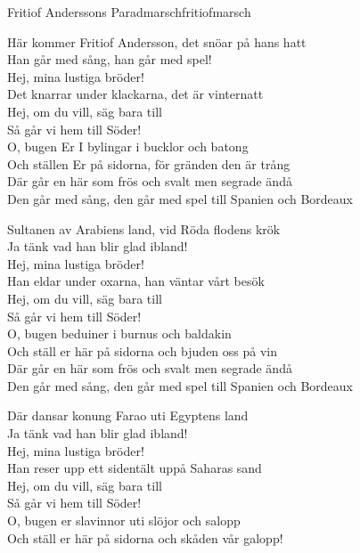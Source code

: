 \begin{song}{Fritiof Anderssons Paradmarsch}{fritiofmarsch}
\begin{vers}
Här kommer Fritiof Andersson, det snöar på hans hatt\\
Han går med sång, han går med spel!\\
Hej, mina lustiga bröder!\\
Det knarrar under klackarna, det är vinternatt\\
Hej, om du vill, säg bara till\\
Så går vi hem till Söder!\\
O, bugen Er I bylingar i bucklor och batong\\
Och ställen Er på sidorna, för gränden den är trång\\
Där går en här som frös och svalt men segrade ändå\\
Den går med sång, den går med spel till Spanien och Bordeaux\\
\end{vers}
\begin{vers}
Sultanen av Arabiens land, vid Röda flodens krök\\
Ja tänk vad han blir glad ibland!\\
Hej, mina lustiga bröder!\\
Han eldar under oxarna, han väntar vårt besök\\
Hej, om du vill, säg bara till\\
Så går vi hem till Söder!\\
O, bugen beduiner i burnus och baldakin\\
Och ställ er här på sidorna och bjuden oss på vin\\
Där går en här som frös och svalt men segrade ändå\\
Den går med sång, den går med spel till Spanien och Bordeaux\\
\end{vers}
\newp
\begin{vers}
Där dansar konung Farao uti Egyptens land\\
Ja tänk vad han blir glad ibland!\\
Hej, mina lustiga bröder!\\
Han reser upp ett sidentält uppå Saharas sand\\
Hej, om du vill, säg bara till\\
Så går vi hem till Söder!\\
O, bugen er slavinnor uti slöjor och salopp\\
Och ställ er här på sidorna och skåden vår galopp!\\

\end{vers}
\end{song}
